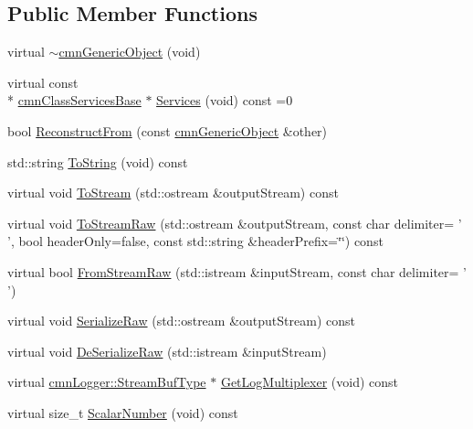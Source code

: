 \subsection*{Public Member Functions}
\begin{DoxyCompactItemize}
\item 
virtual \hyperlink{classcmn_generic_object_ac46f55295b1cef7277f6083a546329af}{$\sim$cmn\-Generic\-Object} (void)
\item 
virtual const \\*
\hyperlink{classcmn_class_services_base}{cmn\-Class\-Services\-Base} $\ast$ \hyperlink{classcmn_generic_object_ac1e9145a0ed0711ac0c0c3edd37b673a}{Services} (void) const =0
\item 
bool \hyperlink{classcmn_generic_object_a7507c3e8f396099599595a0e7f37a89e}{Reconstruct\-From} (const \hyperlink{classcmn_generic_object}{cmn\-Generic\-Object} \&other)
\item 
std\-::string \hyperlink{classcmn_generic_object_a204a55fc8b83c33d241854a77fb5fe0c}{To\-String} (void) const 
\item 
virtual void \hyperlink{classcmn_generic_object_ac2b71ce10573cceff0446748432f45df}{To\-Stream} (std\-::ostream \&output\-Stream) const 
\item 
virtual void \hyperlink{classcmn_generic_object_a8810f78cd3621f37c5e9bbc4679795ce}{To\-Stream\-Raw} (std\-::ostream \&output\-Stream, const char delimiter= ' ', bool header\-Only=false, const std\-::string \&header\-Prefix=\char`\"{}\char`\"{}) const 
\item 
virtual bool \hyperlink{classcmn_generic_object_a41a64299c2410e2bb8e9ff274daad3ed}{From\-Stream\-Raw} (std\-::istream \&input\-Stream, const char delimiter= ' ')
\item 
virtual void \hyperlink{classcmn_generic_object_a8ded5b1c123d923040cd17071f95d8ca}{Serialize\-Raw} (std\-::ostream \&output\-Stream) const 
\item 
virtual void \hyperlink{classcmn_generic_object_a19babea5bb663491b7ff98ef6fce972f}{De\-Serialize\-Raw} (std\-::istream \&input\-Stream)
\item 
virtual \hyperlink{classcmn_logger_a7d192777882d1dc6bb48ceac0b4e65bb}{cmn\-Logger\-::\-Stream\-Buf\-Type} $\ast$ \hyperlink{classcmn_generic_object_a93b122c39a158861bcda067fd5899dcb}{Get\-Log\-Multiplexer} (void) const 
\item 
virtual size\-\_\-t \hyperlink{classcmn_generic_object_ae4e43bf8fd4a1eb17e210b838d8f553c}{Scalar\-Number} (void) const 
\item 

\end{DoxyCompactItemize}
